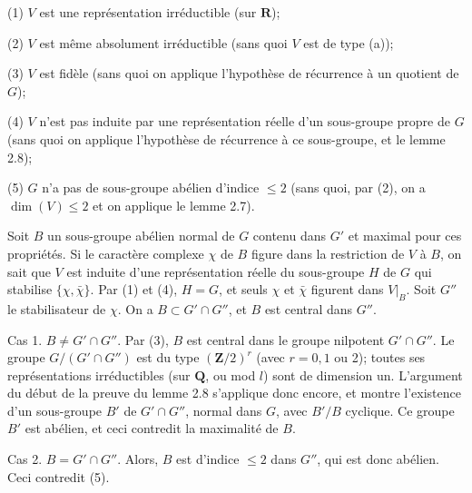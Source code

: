 \documentclass[9pt,twoside]{extarticle}
\begin{document}
{(1) \(V\) est une représentation irréductible (sur \(\mathbf R\));\par

(2) \(V\) est même absolument irréductible (sans quoi \(V\) est de type (a));\par

(3) \(V\) est fidèle (sans quoi on applique l’hypothèse de récurrence à un quotient de \(G\));\par

(4) \(V\) n’est pas induite par une représentation réelle d’un sous-groupe propre de \(G\) (sans quoi on applique l’hypothèse de récurrence à ce sous-groupe, et le lemme 2.8);\par

(5) \(G\) n’a pas de sous-groupe abélien d’indice \(\leq2\) (sans quoi, par (2), on a \(\dim(V)\leq2\) et on applique le lemme 2.7).\par

Soit \(B\) un sous-groupe abélien normal de \(G\) contenu dans \(G'\) et maximal pour ces propriétés. Si le caractère complexe \(\chi\) de \(B\) figure dans la restriction de \(V\) à \(B\), on sait que \(V\) est induite d’une représentation réelle du sous-groupe \(H\) de \(G\) qui stabilise \(\{\chi,\bar\chi\}\). Par (1) et (4), \(H=G\), et seuls \(\chi\) et \(\bar\chi\) figurent dans \(V|_B\). Soit \(G''\) le stabilisateur de \(\chi\). On a \(B\subset G'\cap G''\), et \(B\) est central dans \(G''\).\par

Cas 1. \(B\neq G'\cap G''\). Par (3), \(B\) est central dans le groupe nilpotent \(G'\cap G''\). Le groupe \(G/(G'\cap G'')\) est du type \((\mathbf Z/2)^r\) (avec \(r=0,1\) ou 2); toutes ses représentations irréductibles (sur \(\mathbf Q\), ou mod \(l\)) sont de dimension un. L’argument du début de la preuve du lemme 2.8 s’applique donc encore, et montre l’existence d’un sous-groupe \(B'\) de \(G'\cap G''\), normal dans \(G\), avec \(B'/B\) cyclique. Ce groupe \(B'\) est abélien, et ceci contredit la maximalité de \(B\).\par

Cas 2. \(B=G'\cap G''\). Alors, \(B\) est d’indice \(\leq2\) dans \(G''\), qui est donc abélien. Ceci contredit (5).\par
}
\end{document}
